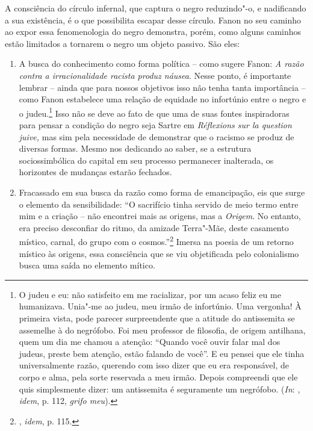 A consciência do círculo infernal, que captura o negro reduzindo"-o, e
nadificando a sua existência, é o que possibilita escapar desse círculo.
Fanon no seu caminho ao expor essa fenomenologia do negro demonstra,
porém, como alguns caminhos estão limitados a tornarem o negro um objeto
passivo. São eles:

\begin{enumerate}[label=\alph*)]
\item
A busca do conhecimento como forma política -- como sugere
Fanon: \emph{A razão contra a irracionalidade racista produz náusea}.
Nesse ponto, é importante lembrar -- ainda que para nossos objetivos isso
não tenha tanta importância -- como Fanon estabelece uma relação de
equidade no infortúnio entre o negro e o judeu.\footnote{O judeu e eu:
  não satisfeito em me racializar, por um acaso feliz eu me humanizava.
  Unia"-me ao judeu, meu irmão de infortúnio. Uma vergonha! À primeira
  vista, pode parecer surpreendente que a atitude do antissemita se
  assemelhe à do negrófobo. Foi meu professor de filosofia, de origem
  antilhana, quem um dia me chamou a atenção: ``Quando você ouvir falar
  mal dos judeus, preste bem atenção, estão falando de você''. E eu
  pensei que ele tinha universalmente razão, querendo com isso dizer que
  eu era responsável, de corpo e alma, pela sorte reservada a meu irmão.
  Depois compreendi que ele quis simplesmente dizer: um antissemita é
  seguramente um negrófobo. (\emph{In}: , \emph{idem}, p. 112, \emph{grifo meu}).}
Isso não se deve ao fato de que uma de suas fontes inspiradoras para
pensar a condição do negro seja Sartre em \emph{Réflexions sur la
question juive,} mas sim pela necessidade de demonstrar que o racismo se
produz de diversas formas. Mesmo nos dedicando ao saber, se a estrutura
sociossimbólica do capital em seu processo permanecer inalterada, os
horizontes de mudanças estarão fechados.
\item
Fracassado em sua busca da razão como forma de emancipação,
eis que surge o elemento da sensibilidade: ``O sacrifício tinha servido
de meio termo entre mim e a criação -- não encontrei mais as origens,
mas a \emph{Origem}. No entanto, era preciso desconfiar do ritmo, da
amizade Terra"-Mãe, deste casamento místico, carnal, do grupo com o
cosmos.''\footnote{, \emph{idem}, p. 115.} Imersa na poesia de um retorno
místico às origens, essa consciência que se viu objetificada pelo
colonialismo busca uma saída no elemento mítico.
\end{enumerate}


